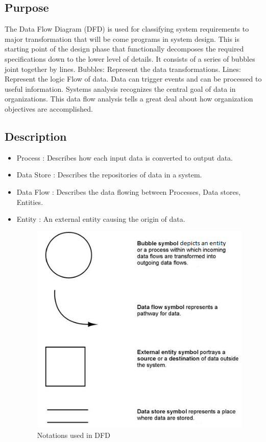 \documentclass[12pt,a4paper,oneside]{report}
\begin{document}
{\subsection {Purpose} 
\par The Data Flow Diagram (DFD) is used for classifying system requirements to major transformation that will be come programs in system design. This is starting point of the design phase that functionally decomposes the required specifications down to the lower level of details. It consists of a series of bubbles joint together by lines. Bubbles: Represent the data transformations. Lines: Represent the logic Flow of data. Data can trigger events and can be processed to useful information. Systems analysis recognizes the central goal of data in organizations. This data flow analysis tells a great deal about how organization objectives are accomplished.


\subsection{Description}
\begin{itemize}
\item  Process : Describes how each input data is converted to output data.
\item  Data Store : Describes the repositories of data in a system.
\item   Data Flow : Describes the data ﬂowing between Processes, Data stores, Entities.
\item   Entity : An external entity causing the origin of data.
\begin{figure}[h]
\begin{center}
\includegraphics[scale=0.75]{dfd.png}
\caption{Notations used in  DFD}
\label{Notations used in  DFD}
\end{center}
\end{figure}
\end{itemize}
\newpage


}
\end{document}

